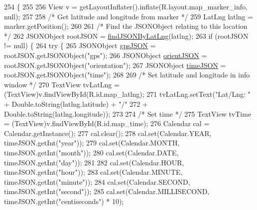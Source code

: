\begin{DoxyCode}
254                                                    \{
255 
256             View v =  getLayoutInflater().inflate(R.layout.map\_marker\_info, null);
257 
258             \textcolor{comment}{/* Get latitude and longitude from marker */}
259             LatLng latlng = marker.getPosition();
260 
261             \textcolor{comment}{/* Find the JSONObject relating to this location */}
262             JSONObject rootJSON = \hyperlink{classcom_1_1jack_1_1motorbikestatistics_1_1_maps_activity_ae5478e56dfb617433d0dfaeb94a403c7}{findJSONByLatLng}(latlng);
263             \textcolor{keywordflow}{if} (rootJSON != null) \{
264                 \textcolor{keywordflow}{try} \{
265                     JSONObject \hyperlink{logging-device_8ino_a548727e041a5cd3db91bdbd0ccd71e30}{gpsJSON} = rootJSON.getJSONObject(\textcolor{stringliteral}{"gps"});
266                     JSONObject \hyperlink{logging-device_8ino_ae8e95a76df2aaa373792e5b744a6bb73}{orientJSON} = rootJSON.getJSONObject(\textcolor{stringliteral}{"orientation"});
267                     JSONObject \hyperlink{logging-device_8ino_acc172a29cb5ff709b48b650d9fb6503c}{timeJSON} = rootJSON.getJSONObject(\textcolor{stringliteral}{"time"});
268 
269                     \textcolor{comment}{/* Set latitude and longitude in info window */}
270                     TextView tvLatLng = (TextView)v.findViewById(R.id.map\_latlng);
271                     tvLatLng.setText(\textcolor{stringliteral}{"Lat/Lng: "} + Double.toString(latlng.latitude) + \textcolor{stringliteral}{"/"}
272                             + Double.toString(latlng.longitude));
273 
274                     \textcolor{comment}{/* Set time */}
275                     TextView tvTime = (TextView)v.findViewById(R.id.map\_time);
276                     Calendar cal = Calendar.getInstance();
277                     cal.clear();
278                     cal.set(Calendar.YEAR, timeJSON.getInt(\textcolor{stringliteral}{"year"}));
279                     cal.set(Calendar.MONTH, timeJSON.getInt(\textcolor{stringliteral}{"month"}));
280                     cal.set(Calendar.DATE, timeJSON.getInt(\textcolor{stringliteral}{"day"}));
281 
282                     cal.set(Calendar.HOUR, timeJSON.getInt(\textcolor{stringliteral}{"hour"}));
283                     cal.set(Calendar.MINUTE, timeJSON.getInt(\textcolor{stringliteral}{"minute"}));
284                     cal.set(Calendar.SECOND, timeJSON.getInt(\textcolor{stringliteral}{"second"}));
285                     cal.set(Calendar.MILLISECOND, timeJSON.getInt(\textcolor{stringliteral}{"centiseconds"}) * 10);

\end{DoxyCode}
